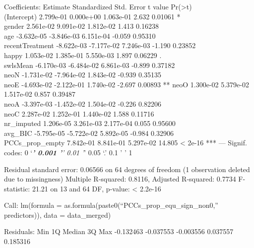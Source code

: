 \documentclass[
  english,
  man]{apa6}
\begin{document}
Coefficients:
Estimate Standardized Std. Error t value Pr(\textgreater\textbar t\textbar)\\
(Intercept) 2.799e-01 0.000e+00 1.063e-01 2.632 0.01061 *\\
gender 2.561e-02 9.091e-02 1.812e-02 1.413 0.16238\\
age -3.632e-05 -3.846e-03 6.151e-04 -0.059 0.95310\\
recentTreatment -8.622e-03 -7.177e-02 7.246e-03 -1.190 0.23852\\
happy 1.053e-02 1.385e-01 5.550e-03 1.897 0.06229 .\\
swlsMean -6.170e-03 -6.484e-02 6.861e-03 -0.899 0.37182\\
neoN -1.731e-02 -7.964e-02 1.843e-02 -0.939 0.35135\\
neoE -4.693e-02 -2.122e-01 1.740e-02 -2.697 0.00893 **
neoO 1.300e-02 5.379e-02 1.517e-02 0.857 0.39487\\
neoA -3.397e-03 -1.452e-02 1.504e-02 -0.226 0.82206\\
neoC 2.287e-02 1.252e-01 1.440e-02 1.588 0.11716\\
nr\_imputed 1.206e-05 3.261e-03 2.177e-04 0.055 0.95600\\
avg\_BIC -5.795e-05 -5.722e-02 5.892e-05 -0.984 0.32906\\
PCCs\_prop\_empty 7.842e-01 8.841e-01 5.297e-02 14.805 \textless{} 2e-16 ***
---
Signif. codes: 0 `\emph{\textbf{' 0.001 '}' 0.01 '}' 0.05 `.' 0.1 ' ' 1

Residual standard error: 0.06566 on 64 degrees of freedom
(1 observation deleted due to missingness)
Multiple R-squared: 0.8116, Adjusted R-squared: 0.7734
F-statistic: 21.21 on 13 and 64 DF, p-value: \textless{} 2.2e-16

Call:
lm(formula = as.formula(paste0(``PCCs\_prop\_equ\_sign\_non0,'' predictors)),
data = data\_merged)

Residuals:
Min 1Q Median 3Q Max
-0.132463 -0.037553 -0.003556 0.037557 0.185316
\end{document}

